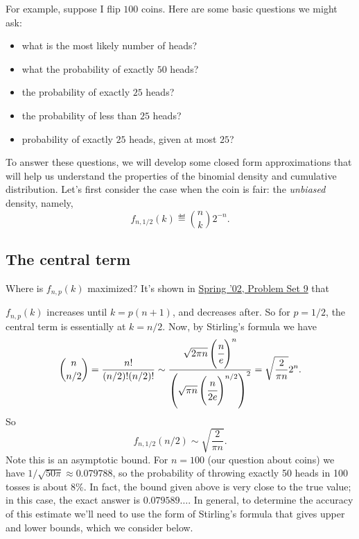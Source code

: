 \documentclass[11pt,twoside]{article}
\begin{document}
\fi

For example, suppose I flip $100$ coins.  Here are some basic questions we
might ask:
\begin{itemize}
\item what is the most likely number of heads?
\item what the probability of exactly $50$ heads?
\item the probability of exactly $25$ heads?
\item the probability of less than $25$ heads?
\item probability of exactly $25$ heads, given at most $25$?
\end{itemize}


To answer these questions, we will develop some closed form approximations
that will help us understand the properties of the binomial density and
cumulative distribution.  Let's first consider the case when the coin is
fair: the \emph{unbiased} density, namely,
\[
f_{n,1/2}(k) \eqdef \binom{n}{k}2^{-n}.
\]

\subsection{The central term}

Where is $f_{n,p}(k)$ maximized?  It's shown in
\href{http://theory.lcs.mit.edu/classes/6.042/spring02/handouts/problemsets/ps9.pdf}
{Spring '02, Problem Set 9} that

$f_{n,p}(k)$ increases until $k=p(n+1)$, and decreases after.
So for $p=1/2$, the central term is essentially at $k=n/2$.  Now, by
Stirling's formula we have
\[
\binom{n}{n/2} = \frac{n!}{(n/2)!(n/2)!} \sim 
\frac{\sqrt{2\pi n}\left(\cfrac{n}{e}\right)^n}{\left(\sqrt{\pi
    n}\left(\cfrac{n}{2e}\right)^{n/2}\right)^2} =
\sqrt{\frac{2}{\pi n}}2^n.
\]
So 
\begin{equation}\label{unbiased central term}
f_{n,1/2}(n/2) \sim \sqrt{\frac{2}{\pi n}}.
\end{equation}
Note this is an asymptotic bound.  For $n=100$ (our question about coins)
we have $1/\sqrt{50 \pi} \approx 0.079788$, so the probability of
throwing exactly 50 heads in 100 tosses is about 8\%.  In fact, the bound
given above is very close to the true value; in this case, the exact
answer is $0.079589\ldots$.  In general, to determine the accuracy of this
estimate we'll need to use the form of Stirling's formula that gives upper
and lower bounds, which we consider below.
\end{document}
